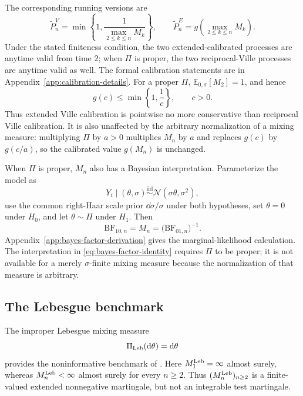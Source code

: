 The corresponding running versions are
\begin{equation}
\label{eq:proper-mixture-running-p-process}
  \widetilde P_n^V
  =
  \min\left\{
    1,
    \frac1{\max_{2\leq k\leq n}M_k}
  \right\},
  \qquad
  \widetilde P_n^E
  =
  g\!\left(\max_{2\leq k\leq n}M_k\right).
\end{equation}
Under the stated finiteness condition, the two extended-calibrated
processes are anytime valid from time \(2\); when \(\Pi\) is proper,
the two reciprocal-Ville processes are anytime valid as well. The
formal calibration statements are in
Appendix~\ref{app:calibration-details}.
For a proper \(\Pi\), \(\mathbb E_{0,\sigma}[M_2]=1\), and hence
\begin{equation}
\label{eq:extended-dominates-ville}
  g(c)
  \leq
  \min\left\{1,\frac1c\right\},
  \qquad c>0.
\end{equation}
Thus extended Ville calibration is pointwise no more conservative than
reciprocal Ville calibration. It is also unaffected by the arbitrary
normalization of a mixing measure: multiplying \(\Pi\) by \(a>0\)
multiplies \(M_n\) by \(a\) and replaces \(g(c)\) by \(g(c/a)\), so
the calibrated value \(g(M_n)\) is unchanged.

When \(\Pi\) is proper, \(M_n\) also has a Bayesian
interpretation. Parameterize the model as
\[
  Y_i\mid(\theta,\sigma)
  \stackrel{\mathrm{iid}}{\sim}
  \mathcal N(\sigma\theta,\sigma^2),
\]
use the common right-Haar scale prior \(\dd\sigma/\sigma\) under both
hypotheses, set \(\theta=0\) under \(H_0\), and let
\(\theta\sim\Pi\) under \(H_1\). Then
\begin{equation}
\label{eq:bayes-factor-identity}
  \mathrm{BF}_{10,n}
  =M_n
  =\bigl(\mathrm{BF}_{01,n}\bigr)^{-1}.
\end{equation}
Appendix~\ref{app:bayes-factor-derivation} gives the marginal-likelihood
calculation. The interpretation in \eqref{eq:bayes-factor-identity}
requires \(\Pi\) to be proper; it is not available for a merely
\(\sigma\)-finite mixing measure because the normalization of that
measure is arbitrary.


\subsection{The Lebesgue benchmark}
\label{subsec:improper-prior}

The improper Lebesgue mixing measure
\[
  \Pi_{\mathrm{Leb}}(\mathrm{d}\theta)=\mathrm{d}\theta
\]
provides the noninformative benchmark of \citet{Lai1976,Wang2025}.
Here \(M_1^{\mathrm{Leb}}=\infty\) almost surely, whereas
\(M_n^{\mathrm{Leb}}<\infty\) almost surely for every \(n\geq2\). Thus
\((M_n^{\mathrm{Leb}})_{n\geq2}\) is a finite-valued extended nonnegative
martingale, but not an integrable test martingale.

